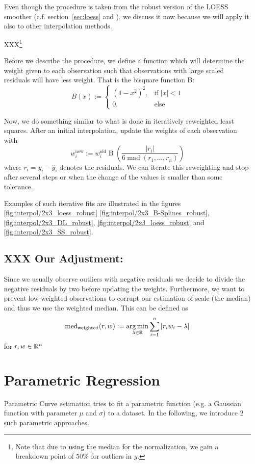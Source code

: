 Even though the procedure is taken from the robust version of the LOESS smoother (c.f. section~\ref{sec:loess} and \cite{clevelandRobustLocallyWeighted1979}), we discuss it now because we will apply it also to other interpolation methods.


XXX\footnote{Note that due to using the median for the normalization, we gain a breakdown point of $50 \%$ for outliers in $y$.}

Before we describe the procedure, we define a function which will determine the weight given to each observation such that observations with large scaled residuals will have less weight. That is the bisquare function B:
$$
	B(x):=\begin{cases}
		\left(1-x^{2}\right)^{2}, & \text{if } |x|<1 \\
		0,                        & \text{else }
	\end{cases}
$$

Now, we do something similar to what is done in iteratively reweighted least squares. After an initial interpolation, update the weights of each observation with
\begin{equation}
	w_i^\text{new}:=w_i^\text{old} \operatorname{B}\left(\frac{|r_i|}{6\operatorname{mad}\left(r_1,\dots,r_n\right)}\right)
	\label{eq:bisquare}
\end{equation}
where $r_i = y_i - \hat y_i$ denotes the residuals. We can iterate this reweighting and stop after several steps or when the change of the values is smaller than some tolerance.

Examples of such iterative fits are illustrated in the figures \ref{fig:interpol/2x3_loess_robust} \ref{fig:interpol/2x3_B-Splines_robust}, \ref{fig:interpol/2x3_DL_robust}, \ref{fig:interpol/2x3_loess_robust} and \ref{fig:interpol/2x3_SS_robust}.


\subsection{XXX Our Adjustment:} Since we usually observe outliers with negative residuals we decide to divide the negative residuals by two before updating the weights. Furthermore, we want to prevent low-weighted observations to corrupt our estimation of scale (the median) and thus we use the weighted median. This can be defined as
$$
	\operatorname{med}_\text{weighted}(r,w) := \operatorname*{arg\, min}_{\lambda \in \mathbb{R}} \sum_{i=1}^n |r_iw_i -\lambda|
$$
for $r,w\in \mathbb{R}^n$

\section{Parametric Regression}
Parametric Curve estimation tries to fit a parametric function (e.g. a Gaussian function with parameter $\mu$ and $\sigma$) to a dataset. In the following, we introduce 2 such parametric approaches.

